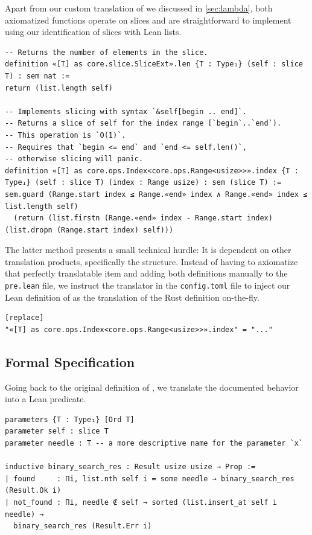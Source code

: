 Apart from our custom translation of  we discussed in
\autoref{sec:lambda}, both axiomatized functions operate on slices and are straightforward to
implement using our identification of slices with Lean lists.

\begin{verbatim}
-- Returns the number of elements in the slice.
definition «[T] as core.slice.SliceExt».len {T : Type₁} (self : slice T) : sem nat :=
return (list.length self)

-- Implements slicing with syntax `&self[begin .. end]`.
-- Returns a slice of self for the index range [`begin`..`end`).
-- This operation is `O(1)`.
-- Requires that `begin <= end` and `end <= self.len()`,
-- otherwise slicing will panic.
definition «[T] as core.ops.Index<core.ops.Range<usize>>».index {T : Type₁} (self : slice T) (index : Range usize) : sem (slice T) :=
sem.guard (Range.start index ≤ Range.«end» index ∧ Range.«end» index ≤ list.length self)
  (return (list.firstn (Range.«end» index - Range.start index) (list.dropn (Range.start index) self)))
\end{verbatim}

The latter method presents a
small technical hurdle: It is dependent on other translation products,
specifically the  structure. Instead of having to axiomatize that
perfectly translatable item and adding both definitions manually to the
\verb!pre.lean! file, we instruct the translator in the \verb!config.toml! file to inject our
Lean definition of  as the translation of the Rust definition on-the-fly.

\begin{verbatim}
[replace]
"«[T] as core.ops.Index<core.ops.Range<usize>>».index" = "..."
\end{verbatim}

\subsection{Formal Specification}

Going back to the original definition of , we translate
the documented behavior into a Lean predicate.

\begin{verbatim}
parameters {T : Type₁} [Ord T]
parameter self : slice T
parameter needle : T -- a more descriptive name for the parameter `x`

inductive binary_search_res : Result usize usize → Prop :=
| found     : Πi, list.nth self i = some needle → binary_search_res (Result.Ok i)
| not_found : Πi, needle ∉ self → sorted (list.insert_at self i needle) →
  binary_search_res (Result.Err i)
\end{verbatim}

